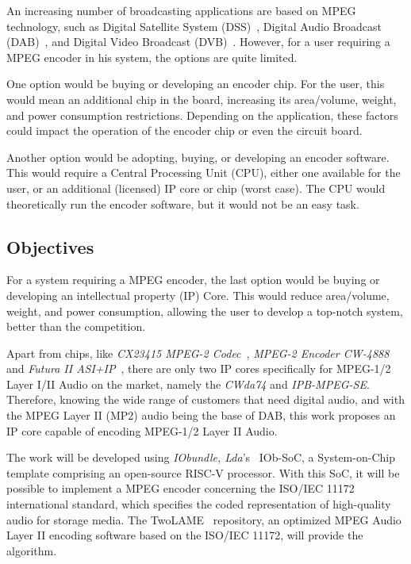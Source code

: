 An increasing number of broadcasting applications are based on MPEG technology, such as Digital Satellite System (DSS)~\cite{dss}, Digital Audio Broadcast (DAB)~\cite{dab}, and Digital Video Broadcast (DVB)~\cite{dvb}. However, for a user requiring a MPEG encoder in his system, the options are quite limited.

One option would be buying or developing an encoder chip. For the user, this would mean an additional chip in the board, increasing its area/volume, weight, and power consumption restrictions. Depending on the application, these factors could impact the operation of the encoder chip or even the circuit board.

Another option would be adopting, buying, or developing an encoder software. This would require a Central Processing Unit (CPU), either one available for the user, or an additional (licensed) IP core or chip (worst case). The CPU would theoretically run the encoder software, but it would not be an easy task.

\subsection{Objectives}

For a system requiring a MPEG encoder, the last option would be buying or developing an intellectual property (IP) Core. This would reduce area/volume, weight, and power consumption, allowing the user to develop a top-notch system, better than the competition.

Apart from chips, like \textit{CX23415 MPEG-2 Codec}~\cite{cx23415}, \textit{MPEG-2 Encoder CW-4888}~\cite{cw4888} and \textit{Futura II ASI+IP}~\cite{futura}, there are only two IP cores specifically for MPEG-1/2 Layer I/II Audio on the market, namely the \textit{CWda74} and \textit{IPB-MPEG-SE}.
Therefore, knowing the wide range of customers that need digital audio, and with the MPEG Layer II (MP2) audio being the base of DAB, this work proposes an IP core capable of encoding MPEG-1/2 Layer II Audio. 

The work will be developed using \textit{IObundle, Lda}'s~\cite{iobundle} IOb-SoC, a System-on-Chip template comprising an open-source RISC-V processor. 
With this SoC, it will be possible to implement a MPEG encoder concerning the ISO/IEC 11172 international standard, which specifies the coded representation of high-quality audio for storage media. The TwoLAME~\cite{twolame} repository, an optimized MPEG Audio Layer II encoding software based on the ISO/IEC 11172, will provide the algorithm.

